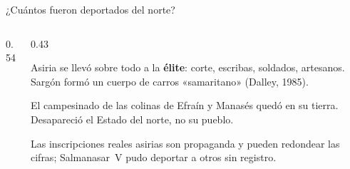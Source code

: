 \begin{frame}{¿Cuántos fueron deportados del norte?}
\begin{columns}[T,onlytextwidth]
\begin{column}{0.54\textwidth}
\end{column}
\begin{column}{0.43\textwidth}\footnotesize
\begin{clave}\footnotesize Asiria se llevó sobre todo a la \textbf{élite}: corte, escribas, soldados, artesanos. Sargón formó un cuerpo de carros «samaritano» (Dalley, 1985).\end{clave}
\begin{clave}\footnotesize El campesinado de las colinas de Efraín y Manasés quedó en su tierra. Desapareció el Estado del norte, no su pueblo.\end{clave}
\begin{notalam}[Precisión]
Las inscripciones reales asirias son propaganda y pueden redondear las cifras; Salmanasar~V pudo deportar a otros sin registro.
\end{notalam}
\end{column}
\end{columns}
\end{frame}

